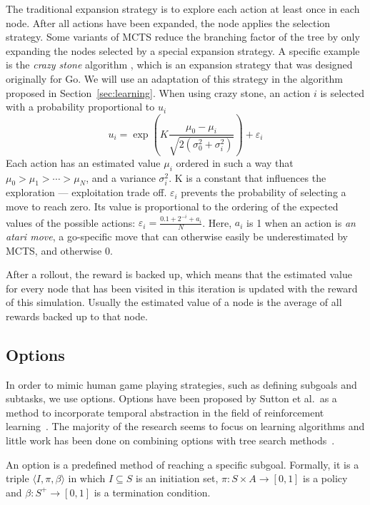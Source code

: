 The traditional expansion strategy is to explore each action at least once in
each node. After all actions have been expanded, the node applies the selection
strategy. Some variants of MCTS reduce the branching
factor of the tree by only expanding the nodes selected by a special expansion
strategy. A specific example is the \emph{crazy stone} algorithm
\cite{coulom2007efficient}, which is an expansion strategy that was designed
originally for Go. We will use an adaptation of this strategy in the algorithm
proposed in Section~\ref{sec:learning}.  When using crazy stone, an action $i$
is selected with a probability proportional to $u_i$
\begin{equation}
	\label{eq:crazystone}
	u_i = \exp\left(K \frac{\mu_0 - \mu_i}{\sqrt{2\left(\sigma_0^2 +
\sigma_i^2\right)}}\right) + \varepsilon_i
\end{equation}
Each action has an estimated value $\mu_i$ ordered in such a way that $\mu_0 >
\mu_1 > \cdots > \mu_N$, and a variance $\sigma_i^2$. K is a constant that
influences the exploration --- exploitation trade off. $\varepsilon_i$ prevents
the probability of selecting a move to reach zero. Its value is proportional to
the ordering of the expected values of the possible actions: $\varepsilon_i =
\frac{0.1 + 2^{-i} + a_i}{N}$\@.  Here, $a_i$ is 1 when an action is \emph{an
atari move}, a go-specific move that can otherwise easily be underestimated by
MCTS, and otherwise 0.

After a rollout, the reward is backed up, which means that the estimated value
for every node that has been visited in this iteration is updated with the
reward of this simulation. Usually the estimated value of a node is the average
of all rewards backed up to that node.

\subsection{Options}
\label{subsec:options}

In order to mimic human game playing strategies, such as defining subgoals and
subtasks, we use options. Options have been proposed by Sutton et al.\ as a
method to incorporate temporal abstraction in the field of reinforcement
learning~\cite{sutton1999between}. The majority of the research seems to focus
on learning algorithms and little work has been done on combining options with
tree search methods~\cite{barto2003recent}.

An option is a predefined method of reaching a specific subgoal. Formally, it is
a triple $\langle I, \pi, \beta\rangle$ in which $I \subseteq S$ is an
initiation set, $\pi: S \times A \rightarrow [0, 1]$ is a policy and $\beta: S^+
\rightarrow[0,1]$ is a termination condition.

